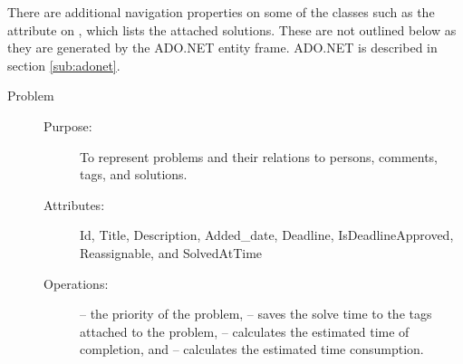 There are additional navigation properties on some of the classes such as the  attribute on , which lists the attached solutions.
These are not outlined below as they are generated by the ADO.NET entity frame.
ADO.NET is described in section \ref{sub:adonet}.
\begin{description}
\item[Problem]\hfill
\begin{description}
	\item[Purpose:]To represent problems and their relations to persons, comments, tags, and solutions.
	\item[Attributes:]Id, Title, Description, Added\_date, Deadline, IsDeadlineApproved, Reassignable, and SolvedAtTime
	\item[Operations:] -- the priority of the problem,  -- saves the solve time to the tags attached to the problem,  -- calculates the estimated time of completion, and   -- calculates the estimated time consumption.
\end{description}
\end{description}

